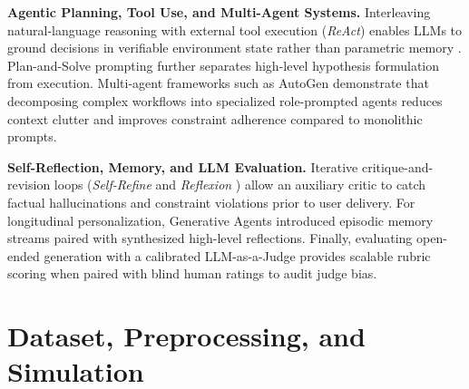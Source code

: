\documentclass{article}
\begin{document}
\textbf{Agentic Planning, Tool Use, and Multi-Agent Systems.} Interleaving natural-language reasoning with external tool execution (\emph{ReAct}) enables LLMs to ground decisions in verifiable environment state rather than parametric memory \cite{yao2023react}. Plan-and-Solve prompting \cite{wang2023planandsolve} further separates high-level hypothesis formulation from execution. Multi-agent frameworks such as AutoGen \cite{wu2023autogen} demonstrate that decomposing complex workflows into specialized role-prompted agents reduces context clutter and improves constraint adherence compared to monolithic prompts.

\textbf{Self-Reflection, Memory, and LLM Evaluation.} Iterative critique-and-revision loops (\emph{Self-Refine} \cite{madaan2023selfrefine} and \emph{Reflexion} \cite{shinn2023reflexion}) allow an auxiliary critic to catch factual hallucinations and constraint violations prior to user delivery. For longitudinal personalization, Generative Agents \cite{park2023generative} introduced episodic memory streams paired with synthesized high-level reflections. Finally, evaluating open-ended generation with a calibrated LLM-as-a-Judge \cite{zheng2023judging} provides scalable rubric scoring when paired with blind human ratings to audit judge bias.

\section{Dataset, Preprocessing, and Simulation}
\label{sec:data}
\end{document}
